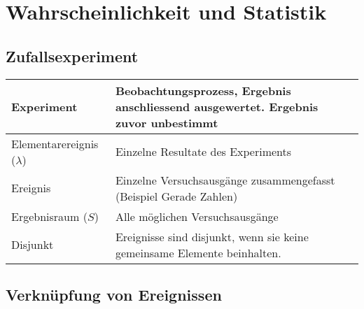 \section{Wahrscheinlichkeit und Statistik}

\subsection{Zufallsexperiment}
\begin{tabular}{|l|l|}
	\hline
	Experiment & Beobachtungsprozess, Ergebnis anschliessend ausgewertet. Ergebnis zuvor unbestimmt\\
	\hline
	Elementarereignis ($\lambda$) & Einzelne Resultate des Experiments\\
	\hline
	Ereignis & Einzelne Versuchsausgänge zusammengefasst (Beispiel Gerade Zahlen)\\
	\hline
	Ergebnisraum ($S$) & Alle möglichen Versuchsausgänge\\
	\hline
	Disjunkt & Ereignisse sind disjunkt, wenn sie keine gemeinsame Elemente beinhalten.\\
	\hline
\end{tabular}

\subsection{Verknüpfung von Ereignissen}


